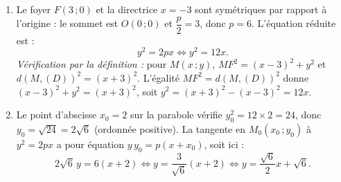 \documentclass[11pt]{article}
\begin{document}
\begin{corrige}
\begin{enumerate}
\item Le foyer $F(3\,;0)$ et la directrice $x=-3$ sont symétriques par rapport à l'origine : le sommet est $O(0\,;0)$ et $\dfrac{p}{2}=3$, donc $p=6$. L'équation réduite est :
\[ y^{2}=2px \iff y^{2}=12x. \]
\emph{Vérification par la définition :} pour $M(x\,;y)$, $MF^{2}=(x-3)^{2}+y^{2}$ et $d(M,(D))^{2}=(x+3)^{2}$. L'égalité $MF^{2}=d(M,(D))^{2}$ donne $(x-3)^{2}+y^{2}=(x+3)^{2}$, soit $y^{2}=(x+3)^{2}-(x-3)^{2}=12x$.
\item Le point d'abscisse $x_{0}=2$ sur la parabole vérifie $y_{0}^{2}=12\times 2=24$, donc $y_{0}=\sqrt{24}=2\sqrt{6}$ (ordonnée positive). La tangente en $M_{0}(x_{0}\,;y_{0})$ à $y^{2}=2px$ a pour équation $y\,y_{0}=p(x+x_{0})$, soit ici :
\[ 2\sqrt{6}\,y=6(x+2) \iff y=\dfrac{3}{\sqrt{6}}(x+2) \iff y=\dfrac{\sqrt{6}}{2}x+\sqrt{6}. \]
\end{enumerate}
\end{corrige}
\end{document}
